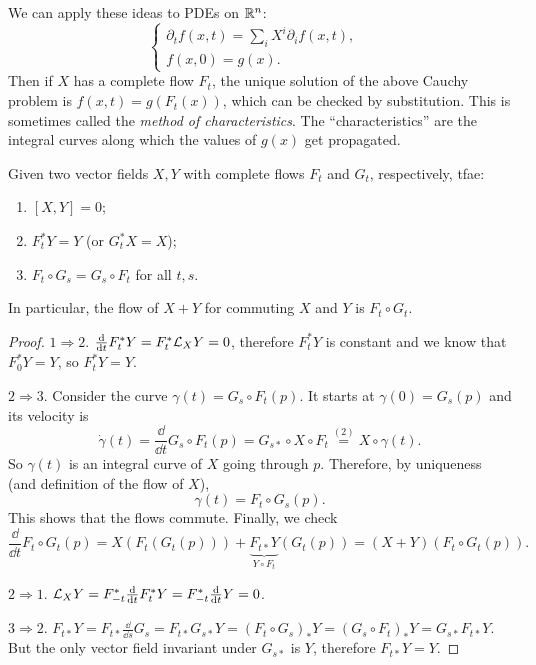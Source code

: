 \begin{rem}
    We can apply these ideas to PDEs on $\mathbb{R}^n$:
    \[\begin{cases}
        \partial_t f(x,t)=\sum _i X^i \partial_i f(x,t),&\\
        f(x,0)=g(x).&
    \end{cases}\]
    Then if $X$ has a complete flow $F_t$, the unique solution of the above Cauchy problem is $f(x,t)=g(F_t(x))$, which can be checked by substitution. This is sometimes called the \emph{method of characteristics}. The ``characteristics'' are the integral curves along which the values of $g(x)$ get propagated.
\end{rem}

\begin{prop}
    Given two vector fields $X,Y$ with complete flows $F_t$ and $G_t$, respectively, \gls{tfae}:
    \begin{enumerate}
        \item $[X,Y]=0$;
        \item $F^\ast_t Y=Y$ (or $G^\ast_t X=X$);
        \item $F_t\circ G_s=G_s\circ F_t$ for all $t,s$. 
    \end{enumerate}
    In particular, the flow of $X+Y$ for commuting $X$ and $Y$ is $F_t\circ G_t$.
\end{prop}
\begin{proof}
    $1\Rightarrow 2$. $\frac{{\mathrm{d}}}{{\mathrm{d}} t}F^\ast_t Y=F^\ast_t \mathcal{L}_X Y=0$, therefore $F^\ast_t Y$ is constant and we know that $F^\ast_0 Y=Y$, so $F^\ast_t Y=Y$.

    $2\Rightarrow 3$. Consider the curve $\gamma(t)=G_s\circ F_t(p)$. It starts at $\gamma(0)=G_s(p)$ and its velocity is
    \[\dot\gamma(t)=\frac{\dd}{\dd t} G_s\circ F_t(p)=G_{s\ast}\circ X\circ F_t\overset{(2)}{=}X\circ\gamma(t).\]
    So $\gamma(t)$ is an integral curve of $X$ going through $p$. Therefore, by uniqueness (and definition of the flow of $X$), 
    \[\gamma(t)=F_t\circ G_s(p).\]
    This shows that the flows commute. Finally, we check 
    \[\frac{\dd}{\dd t} F_t\circ G_t(p)=X(F_t(G_t(p)))+\underbrace{F_{t\ast }Y}_{Y\circ F_t}(G_t(p))=(X+Y)(F_t\circ G_t(p)).\]

    $2\Rightarrow 1$. $\mathcal{L}_X Y=F^\ast_{-t}\frac{{\mathrm{d}}}{{\mathrm{d}} t}F^\ast_t Y=F^\ast_{-t} \frac{{\mathrm{d}}}{{\mathrm{d}} t}Y=0$.

    $3\Rightarrow 2$. $F_{t\ast}Y=F_{t\ast}\frac{\dd}{\dd s}G_s=F_{t\ast} G_{s\ast} Y=(F_t\circ G_s)_\ast Y=(G_s\circ F_t)_\ast Y=G_{s\ast}F_{t\ast}Y$. But the only vector field invariant under $G_{s\ast}$ is $Y$, therefore $F_{t\ast}Y=Y$.
\end{proof}

